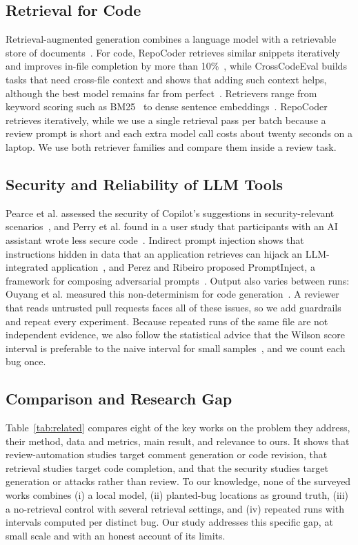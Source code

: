 \documentclass[12pt,onecolumn,draftclsnofoot]{IEEEtran}
\begin{document}
\subsection{Retrieval for Code}
Retrieval-augmented generation combines a language model with a retrievable store of documents~\cite{lewis2020rag,gao2023ragsurvey}. For code, RepoCoder retrieves similar snippets iteratively and improves in-file completion by more than 10\%~\cite{zhang2023repocoder}, while CrossCodeEval builds tasks that need cross-file context and shows that adding such context helps, although the best model remains far from perfect~\cite{ding2023crosscodeeval}. Retrievers range from keyword scoring such as BM25~\cite{robertson2009bm25} to dense sentence embeddings~\cite{reimers2019sbert}. RepoCoder retrieves iteratively, while we use a single retrieval pass per batch because a review prompt is short and each extra model call costs about twenty seconds on a laptop. We use both retriever families and compare them inside a review task.

\subsection{Security and Reliability of LLM Tools}
Pearce et al. assessed the security of Copilot's suggestions in security-relevant scenarios~\cite{pearce2022asleep}, and Perry et al. found in a user study that participants with an AI assistant wrote less secure code~\cite{perry2023insecure}. Indirect prompt injection shows that instructions hidden in data that an application retrieves can hijack an LLM-integrated application~\cite{greshake2023indirect}, and Perez and Ribeiro proposed PromptInject, a framework for composing adversarial prompts~\cite{perez2022ignore}. Output also varies between runs: Ouyang et al. measured this non-determinism for code generation~\cite{ouyang2023nondeterminism}. A reviewer that reads untrusted pull requests faces all of these issues, so we add guardrails and repeat every experiment. Because repeated runs of the same file are not independent evidence, we also follow the statistical advice that the Wilson score interval is preferable to the naive interval for small samples~\cite{brown2001interval}, and we count each bug once.

\subsection{Comparison and Research Gap}
Table~\ref{tab:related} compares eight of the key works on the problem they address, their method, data and metrics, main result, and relevance to ours. It shows that review-automation studies target comment generation or code revision, that retrieval studies target code completion, and that the security studies target generation or attacks rather than review. To our knowledge, none of the surveyed works combines (i) a local model, (ii) planted-bug locations as ground truth, (iii) a no-retrieval control with several retrieval settings, and (iv) repeated runs with intervals computed per distinct bug. Our study addresses this specific gap, at small scale and with an honest account of its limits.
\end{document}
